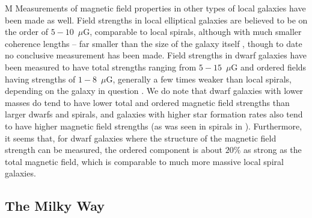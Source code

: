 
M
Measurements of magnetic field properties in other types of local
galaxies have been made as well.  Field strengths in local elliptical
galaxies are believed to be on the order of $5-10$~$\mu$G, comparable to local
spirals, although with much smaller coherence lengths -- far smaller
than the size of the galaxy itself
\cite{1993A&ARv...4..449W,1996MNRAS.279..229M}, though to date no conclusive
measurement has been made.  Field strengths in
dwarf galaxies have been measured to have total 
strengths ranging from $5-15$~$\mu$G and ordered fields having strengths
of $1-8$~$\mu$G, generally a few times weaker than local spirals,
depending on the galaxy in question
\cite{2000A&A...355..128C,2011A&A...529A..94C,2012MNRAS.423L.127R,Mao12,2013MNRAS.435..149N,2014A&A...567A.134J}.
We do note that dwarf galaxies with lower masses do tend to have lower
total and ordered magnetic field strengths than larger dwarfs
and spirals, and galaxies with higher star formation rates also
tend to have higher magnetic field strengths (as was seen in spirals
in \cite{2014arXiv1411.1386V}).  Furthermore, it seems that, for dwarf
galaxies where the structure of the magnetic field strength can be
measured, the ordered component is about $20\%$ as strong as the total
magnetic field, which is comparable to much more massive local spiral galaxies.

\vspace{-3mm}
\subsection{The Milky Way}
\label{sec:milkyway}
\vspace{-2mm}

